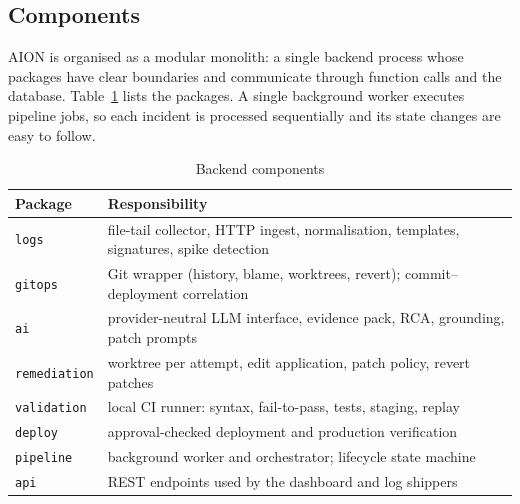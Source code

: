 \documentclass[conference]{IEEEtran}
\begin{document}
\subsection{Components}
AION is organised as a modular monolith: a single backend process whose packages have clear boundaries and communicate through function calls and the database. Table~\ref{tab:components} lists the packages. A single background worker executes pipeline jobs, so each incident is processed sequentially and its state changes are easy to follow.

\begin{table}[t]
\centering
\caption{Backend components}
\label{tab:components}
\footnotesize
\begin{tabular}{@{}p{1.85cm}p{5.75cm}@{}}
\toprule
Package & Responsibility \\
\midrule
\texttt{logs} & file-tail collector, HTTP ingest, normalisation, templates, signatures, spike detection \\
\texttt{gitops} & Git wrapper (history, blame, worktrees, revert); commit--deployment correlation \\
\texttt{ai} & provider-neutral LLM interface, evidence pack, RCA, grounding, patch prompts \\
\texttt{remediation} & worktree per attempt, edit application, patch policy, revert patches \\
\texttt{validation} & local CI runner: syntax, fail-to-pass, tests, staging, replay \\
\texttt{deploy} & approval-checked deployment and production verification \\
\texttt{pipeline} & background worker and orchestrator; lifecycle state machine \\
\texttt{api} & REST endpoints used by the dashboard and log shippers \\
\bottomrule
\end{tabular}
\end{table}
\end{document}
